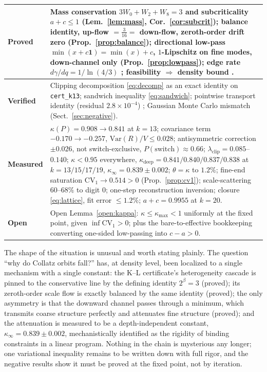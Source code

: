 \documentclass[11pt]{article}
\theoremstyle{definition}
\theoremstyle{remark}
\newcommand{\CV}{\mathrm{CV}}
\newcommand{\Var}{\mathrm{Var}}
\newcommand{\lam}{\lambda}
\newcommand{\gam}{\gamma}
\newcommand{\bet}{\beta}
\newcommand{\kap}{\kappa}
\begin{document}
\begin{center}
\begin{tabular}{p{} p{}}
\hline
\textbf{Proved} &
Mass conservation $3W_0 + W_2 + W_8 = 3$ and subcriticality $a + c \leq 1$
(Lem.~\ref{lem:mass}, Cor.~\ref{cor:subcrit});
balance identity, up-flow $= \tfrac{3}{16} =$ down-flow, zeroth-order
drift zero (Prop.~\ref{prop:balance});
directional low-pass $\min(x + c\mathbf{1}) = \min(x) + c$, $1$-Lipschitz
on fine modes, down-channel only (Prop.~\ref{prop:lowpass});
edge rate $d\gam/dq = 1/\ln(4/3)$ \cite{Temp26};
feasibility $\Rightarrow$ density bound \cite{KL03}. \\
\hline
\textbf{Verified} &
Clipping decomposition \eqref{eq:decomp} as an exact identity on
\texttt{cert\_k13}; sandwich inequality \eqref{eq:sandwich};
pointwise transport identity (residual $2.8 \times 10^{-4}$)
\cite{Temp26}; Gaussian Monte Carlo mismatch
(Sect.~\ref{sec:negative}). \\
\hline
\textbf{Measured} &
$\kap(P) = 0.908 \to 0.841$ at $k = 13$;
covariance term $-0.170 \to -0.257$, $\Var(R)/V \leq 0.028$;
antisymmetric correction $\pm 0.026$, not switch-exclusive,
$P(\mathrm{switch}) \approx 0.66$;
$\lam_{\mathrm{clip}} = 0.085$--$0.140$;
$\kap < 0.95$ everywhere, $\kap_{\mathrm{deep}} = 0.841/0.840/0.837/0.838$
at $k = 13/15/17/19$, $\kap_\infty = 0.839 \pm 0.002$;
$\theta = \kap$ to $1.2\%$;
fine-end saturation $\CV_1 \to 0.514 > 0$ (Prop.~\ref{prop:cv1});
scale-scattering $60$--$68\%$ to digit $0$;
one-step reconstruction inversion;
closure \eqref{eq:lattice}, fit error $\leq 1.2\%$;
$a + c = 0.9955$ at $k = 20$. \\
\hline
\textbf{Open} &
Open Lemma~\ref{open:kappa}: $\kap \leq \kap_{\max} < 1$ uniformly at the
fixed point, given $\inf \CV_1 > 0$; plus the bare-to-effective
bookkeeping converting one-sided low-passing into $c - a > 0$. \\
\hline
\end{tabular}
\end{center}

\medskip

The shape of the situation is unusual and worth stating plainly. The
question ``why do Collatz orbits fall?'' has, at density level, been
localized to a single mechanism with a single constant: the K--L
certificate's heterogeneity cascade is pinned to the conservative line by
the defining identity $2^{\bet} = 3$ (proved); its zeroth-order scale flow
is exactly balanced by the same identity (proved); the only asymmetry is
that the downward channel passes through a minimum, which transmits coarse
structure perfectly and attenuates fine structure (proved); and the
attenuation is measured to be a depth-independent constant,
$\kap_\infty = 0.839 \pm 0.002$, mechanistically identified as the
rigidity of binding constraints in a linear program. Nothing in the chain
is mysterious any longer; one variational inequality remains to be
written down with full rigor, and the negative results show it must be
proved at the fixed point, not by iteration.
\end{document}
